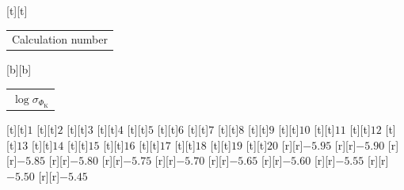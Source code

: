 %    
%
%
\begin{psfrags}%
\psfragscanon%
%
[t][t]{\color[rgb]{0,0,0}\setlength{\tabcolsep}{0pt}\begin{tabular}{c}{\Large{}Calculation number}\end{tabular}}%
[b][b]{\color[rgb]{0,0,0}\setlength{\tabcolsep}{0pt}\begin{tabular}{c}{\Large$\log \sigma_{\Phi_\mathrm{K}}$\vspace{2mm}}\end{tabular}}%
%
[t][t]{$1$}%
[t][t]{$2$}%
[t][t]{$3$}%
[t][t]{$4$}%
[t][t]{$5$}%
[t][t]{$6$}%
[t][t]{$7$}%
[t][t]{$8$}%
[t][t]{$9$}%
[t][t]{$10$}%
[t][t]{$11$}%
[t][t]{$12$}%
[t][t]{$13$}%
[t][t]{$14$}%
[t][t]{$15$}%
[t][t]{$16$}%
[t][t]{$17$}%
[t][t]{$18$}%
[t][t]{$19$}%
[t][t]{$20$}%
%
[r][r]{$-5.95$}%
[r][r]{$-5.90$}%
[r][r]{$-5.85$}%
[r][r]{$-5.80$}%
[r][r]{$-5.75$}%
[r][r]{$-5.70$}%
[r][r]{$-5.65$}%
[r][r]{$-5.60$}%
[r][r]{$-5.55$}%
[r][r]{$-5.50$}%
[r][r]{$-5.45$}%
%
%
\end{psfrags}%
%
